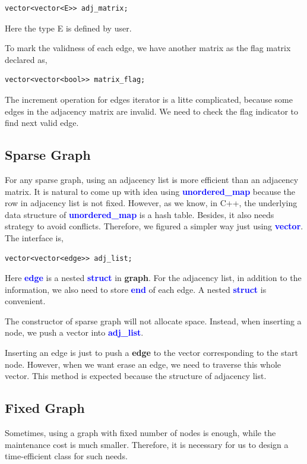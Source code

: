 \documentclass[]{article}
\begin{document}
\begin{lstlisting}
vector<vector<E>> adj_matrix;

\end{lstlisting} 
Here the type E is defined by user. 

To mark the validness of each edge, we have another matrix as the flag matrix declared as,
\begin{lstlisting}
vector<vector<bool>> matrix_flag;
\end{lstlisting}

The increment operation for edges iterator is a litte complicated, because some edges in the adjacency matrix are invalid. We need to check the flag indicator to find next valid edge.

\subsection{Sparse Graph}
For any sparse graph, using an adjacency list is more efficient than an adjacency matrix. It is natural to come up with idea using \textbf{\textcolor{blue}{unordered\_map}} because the row in adjacency list is not fixed. However, as we know, in C++, the underlying data structure of \textbf{\textcolor{blue}{unordered\_map}} is a hash table. Besides, it also needs strategy to avoid conflicts. Therefore, we figured a simpler way just using \textbf{\textcolor{blue}{vector}}. The interface is,
\begin{lstlisting}
vector<vector<edge>> adj_list;

\end{lstlisting} 
Here \textbf{\textcolor{blue}{edge}} is a nested \textbf{\textcolor{blue}{struct}} in \textbf{graph}. For the adjacency list, in addition to the information, we also need to store \textbf{\textcolor{blue}{end}} of each edge. A nested \textbf{\textcolor{blue}{struct}} is convenient.

The constructor of sparse graph will not allocate space. Instead, when inserting a node, we push a vector into \textbf{\textcolor{blue}{adj\_list}}.

Inserting an edge is just to push a \textbf{edge} to the vector corresponding to the start node. However, when we want erase an edge, we need to traverse this whole vector. This method is expected because the structure of adjacency list. 
\subsection{Fixed Graph}
Sometimes, using a graph with fixed number of nodes is enough, while the maintenance cost is much smaller. Therefore, it is necessary for us to design a time-efficient class for such needs.
\end{document}
